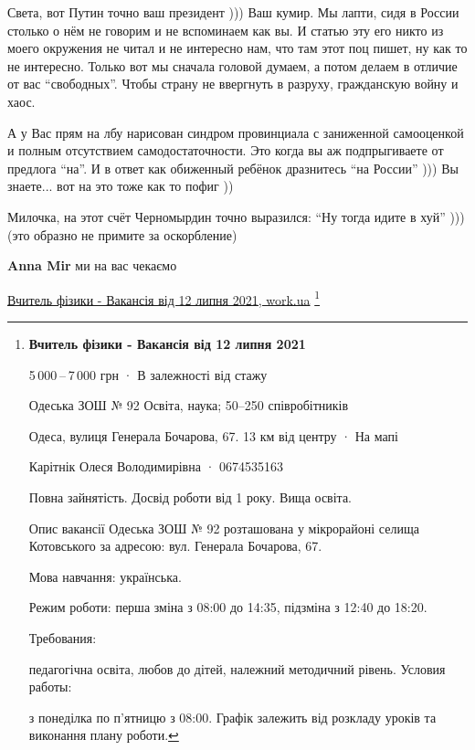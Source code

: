 \begin{itemize}
\begin{itemize}
Света, вот Путин точно ваш президент ))) Ваш кумир. Мы лапти, сидя в России
столько о нём не говорим и не вспоминаем как вы. И статью эту его никто из
моего окружения не читал и не интересно нам, что там этот поц пишет, ну как то
не интересно. Только вот мы сначала головой думаем, а потом делаем в отличие от
вас \enquote{свободных}. Чтобы страну не ввергнуть в разруху, гражданскую войну и хаос.

А у Вас прям на лбу нарисован синдром провинциала с заниженной самооценкой и
полным отсутствием самодостаточности. Это когда вы аж подпрыгиваете от предлога
\enquote{на}. И в ответ как обиженный ребёнок дразнитесь \enquote{на России} ))) Вы знаете...
вот на это тоже как то пофиг ))

Милочка, на этот счёт Черномырдин точно выразился: \enquote{Ну тогда идите в хуй} )))
(это образно не примите за оскорбление) \Laughey[1.0][white]

 
\textbf{Anna Mir} ми на вас чекаємо 

\href{https://www.work.ua/jobs/3970487/}{Вчитель фізики - Вакансія від 12 липня 2021, work.ua}
\footnote{
{\bfseries Вчитель фізики - Вакансія від 12 липня 2021}

5 000 – 7 000 грн · В залежності від стажу

Одеська ЗОШ № 92 
Освіта, наука; 50–250 співробітників

Одеса, вулиця Генерала Бочарова, 67.
13 км від центру · На мапі

Карітнік Олеся Володимирівна · 0674535163 

Повна зайнятість. Досвід роботи від 1 року. Вища освіта.

Опис вакансії
Одеська ЗОШ № 92 розташована у мікрорайоні селища Котовського за адресою: вул. Генерала Бочарова, 67.

Мова навчання: українська.

Режим роботи: перша зміна з 08:00 до 14:35, підзміна з 12:40 до 18:20.

Требования:

педагогічна освіта, любов до дітей, належний методичний рівень.
Условия работы:

з понеділка по п’ятницю з 08:00. Графік залежить від розкладу уроків та виконання плану роботи.

}
\end{itemize}
\end{itemize}
